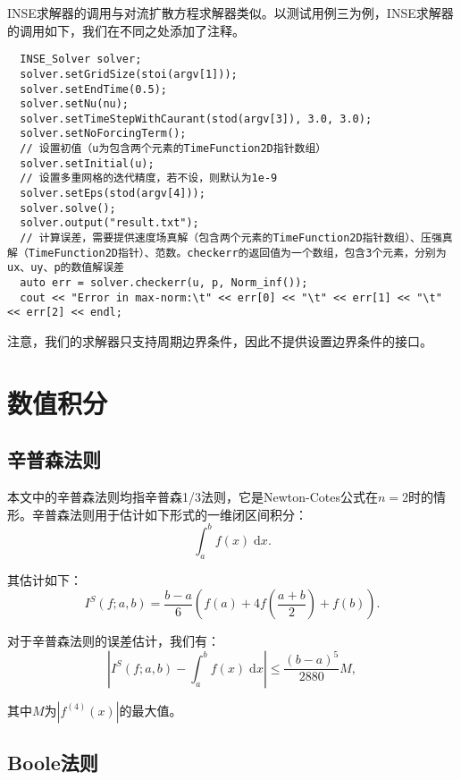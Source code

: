 \documentclass[lang=cn,10pt,bibend=bibtex]{elegantbook}
\begin{document}
INSE求解器的调用与对流扩散方程求解器类似。以测试用例三为例，INSE求解器的调用如下，我们在不同之处添加了注释。
\begin{lstlisting}
  INSE_Solver solver;
  solver.setGridSize(stoi(argv[1]));
  solver.setEndTime(0.5);
  solver.setNu(nu);
  solver.setTimeStepWithCaurant(stod(argv[3]), 3.0, 3.0);
  solver.setNoForcingTerm();
  // 设置初值（u为包含两个元素的TimeFunction2D指针数组）
  solver.setInitial(u);
  // 设置多重网格的迭代精度，若不设，则默认为1e-9
  solver.setEps(stod(argv[4]));
  solver.solve();
  solver.output("result.txt");
  // 计算误差，需要提供速度场真解（包含两个元素的TimeFunction2D指针数组）、压强真解（TimeFunction2D指针）、范数。checkerr的返回值为一个数组，包含3个元素，分别为ux、uy、p的数值解误差
  auto err = solver.checkerr(u, p, Norm_inf());
  cout << "Error in max-norm:\t" << err[0] << "\t" << err[1] << "\t" << err[2] << endl;
\end{lstlisting}

注意，我们的求解器只支持周期边界条件，因此不提供设置边界条件的接口。

\newpage

\chapter{数值积分}

\section{辛普森法则}

本文中的辛普森法则均指辛普森1/3法则，它是Newton-Cotes公式在$n=2$时的情形。辛普森法则用于估计如下形式的一维闭区间积分：
\begin{equation*}
  \int_a^b f(x) \;\text{d}x.
\end{equation*}

其估计如下：
\begin{equation*}
  I^S(f;a,b) = \frac{b-a}{6}\left(f(a)+4f\left(\frac{a+b}{2}\right)+f(b)\right).
\end{equation*}

对于辛普森法则的误差估计，我们有：
\begin{equation*}
  \left|I^S(f;a,b)-\int_a^b f(x) \;\text{d}x\right|\leq \frac{(b-a)^5}{2880}M,
\end{equation*}

其中$M$为$|f^{(4)}(x)|$的最大值。

\section{Boole法则}
\end{document}
